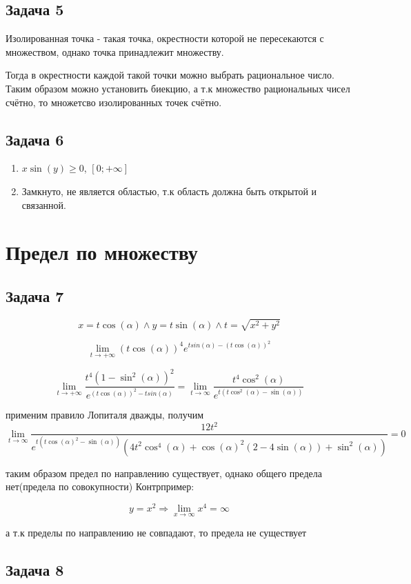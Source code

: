 \documentclass[a4paper,12pt]{article}
\begin{document}
\subsection{Задача 5}
Изолированная точка - такая точка, окрестности которой не пересекаются с множеством, однако точка принадлежит множеству.

Тогда в окрестности каждой такой точки можно выбрать рациональное число. Таким образом можно установить биекцию, а т.к множество рациональных чисел счётно, то множетсво изолированных точек счётно.
\subsection{Задача 6}
\begin{enumerate}
    \item $x\sin(y)\ge 0$, $[0;+\infty]$
    \item Замкнуто, не является областью, т.к область должна быть открытой и связанной.
\end{enumerate}

\section{Предел по множеству}

\subsection{Задача 7}

\[
x = t\cos(\alpha) \land y = t\sin(\alpha) \land t = \sqrt{x^2+y^2}
\]

\[
\lim_{t \to +\infty} (t\cos(\alpha))^4e^{tsin(\alpha)-(t\cos(\alpha))^2}
\]

\[
\lim_{t \to +\infty} \frac{t^4(1-\sin^2(\alpha))^2}{e^{(t\cos(\alpha))^2-tsin(\alpha)}} = \lim_{t \to \infty} \frac{t^4\cos^2(\alpha)}{e^{t(t\cos^2(\alpha)-\sin(\alpha))}}
\]

применим правило Лопиталя дважды, получим
\[
\lim_{t \to \infty} \frac{12t^2}{e^{t(t\cos(\alpha)^2-\sin(\alpha))}(4t^2\cos^4(\alpha)+\cos(\alpha)^2(2-4\sin(\alpha))+\sin^2(\alpha))} = 0
\]

таким образом предел по направлению существует, однако общего предела нет(предела по совокупности) Контрпример:

\[
y=x^2 \Rightarrow \lim_{x \to \infty} x^4 = \infty
\]

а т.к пределы по направлению не совпадают, то предела не существует
\subsection{Задача 8}
\end{document}
